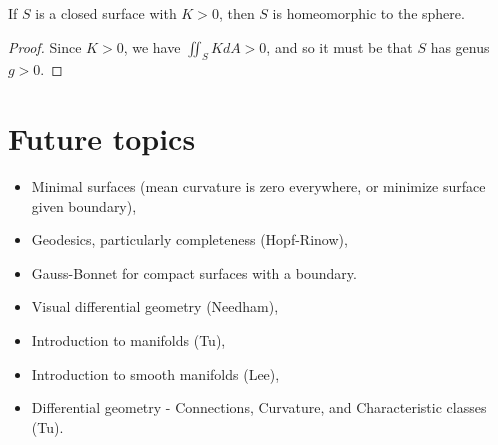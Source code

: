 \begin{cor}
    If $S$ is a closed surface with $K > 0$, then $S$ is homeomorphic to the sphere.
\end{cor}

\begin{proof}
    Since $K > 0$, we have $\iint_{S}KdA > 0$, and so it must be that $S$ has genus $g > 0$.
\end{proof}

\section{Future topics}

\begin{itemize}
    \item Minimal surfaces (mean curvature is zero everywhere, or minimize surface given boundary),
    \item Geodesics, particularly completeness (Hopf-Rinow),
    \item Gauss-Bonnet for compact surfaces with a boundary.
    \item Visual differential geometry (Needham),
    \item Introduction to manifolds (Tu),
    \item Introduction to smooth manifolds (Lee),
    \item Differential geometry - Connections, Curvature, and Characteristic classes (Tu).
\end{itemize}
